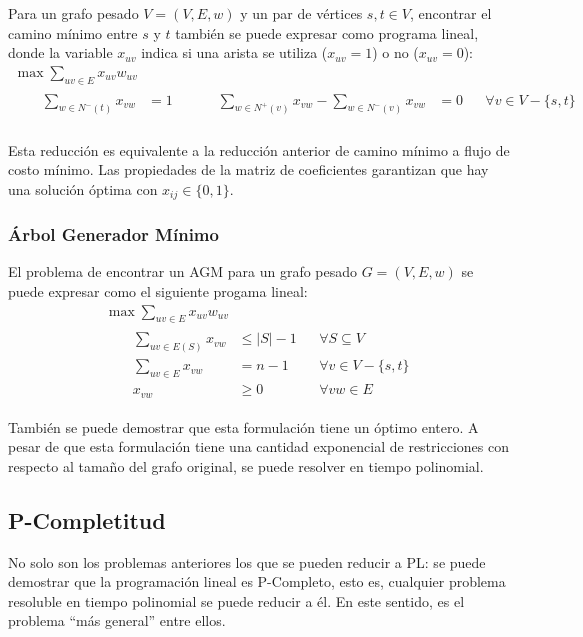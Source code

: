 \documentclass[a4paper]{report}
\begin{document}
Para un grafo pesado $V = (V, E, w)$ y un par de vértices $s, t \in V$, encontrar el camino mínimo entre $s$ y $t$ también se puede expresar como programa lineal, donde la variable $x_{uv}$ indica si una arista se utiliza ($x_{uv} = 1$) o no ($x_{uv} = 0$):
\begin{gather*}
    \max{\sum_{uv \in E} x_{uv} w_{uv}} \\
    \begin{flalign*}
        && \sum_{w \in N^-(t)} x_{vw} & = 1 && 
        && \sum_{w \in N^+(v)} x_{vw} - \sum_{w \in N^-(v)} x_{vw} & = 0 && \forall v \in V - \{s, t\} \\
    \end{flalign*}
\end{gather*}

Esta reducción es equivalente a la reducción anterior de camino mínimo a flujo de costo mínimo. Las propiedades de la matriz de coeficientes garantizan que hay una solución óptima con $x_{ij} \in \{0, 1\}$.

\subsubsection{Árbol Generador Mínimo}

El problema de encontrar un AGM para un grafo pesado $G = (V, E, w)$ se puede expresar como el siguiente progama lineal:
\begin{gather*}
    \max{\sum_{uv \in E} x_{uv} w_{uv}} \\
    \begin{flalign*}
        && \sum_{uv \in E(S)} x_{vw} & \leq |S| - 1 && \forall S \subseteq V \\ 
        && \sum_{uv \in E} x_{vw} & = n - 1 && \forall v \in V - \{s, t\} \\
        && x_{vw} & \geq 0 && \forall vw \in E
    \end{flalign*}
\end{gather*}

También se puede demostrar que esta formulación tiene un óptimo entero. A pesar de que esta formulación tiene una cantidad exponencial de restricciones con respecto al tamaño del grafo original, se puede resolver en tiempo polinomial.

\subsection{P-Completitud}

No solo son los problemas anteriores los que se pueden reducir a PL: se puede demostrar que la programación lineal es P-Completo, esto es, cualquier problema resoluble en tiempo polinomial se puede reducir a él. En este sentido, es el problema ``más general'' entre ellos.
\end{document}
